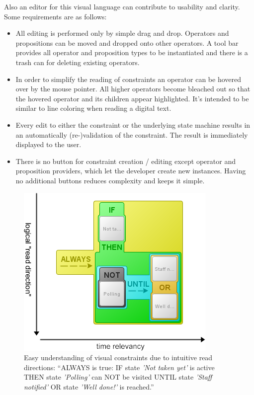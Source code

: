 \documentclass[conference]{IEEEtran}
\begin{document}
Also an editor for this visual language can contribute to usability and clarity. Some requirements are as follows:

\begin{itemize}	
	\item All editing is performed only by simple drag and drop. Operators and propositions can be moved and dropped onto other operators. A tool bar provides all operator and proposition types to be instantiated and there is a trash can for deleting existing operators.
	\item In order to simplify the reading of constraints an operator can be hovered over by the mouse pointer. All higher operators become bleached out so that the hovered operator and its children appear highlighted. It's intended to be similar to line coloring when reading a digital text.
	\item Every edit to either the constraint or the underlying state machine results in an automatically (re-)validation of the constraint. The result is immediately displayed to the user.
	\item There is no button for constraint creation / editing except operator and proposition providers, which let the developer create new instances. Having no additional buttons reduces complexity and keeps it simple.
\end{itemize}


\begin{figure}[htbp]
  \centering
  \includegraphics[scale=0.5]{directions}
  \caption{Easy understanding of visual constraints due to intuitive read directions: ``ALWAYS is true: IF state \emph{'Not taken yet'} is active THEN state \emph{'Polling'} can NOT be visited UNTIL state \emph{'Staff notified'} OR state \emph{'Well done!'} is reached.''}
  \label{fig:directions}
\end{figure}
\end{document}

